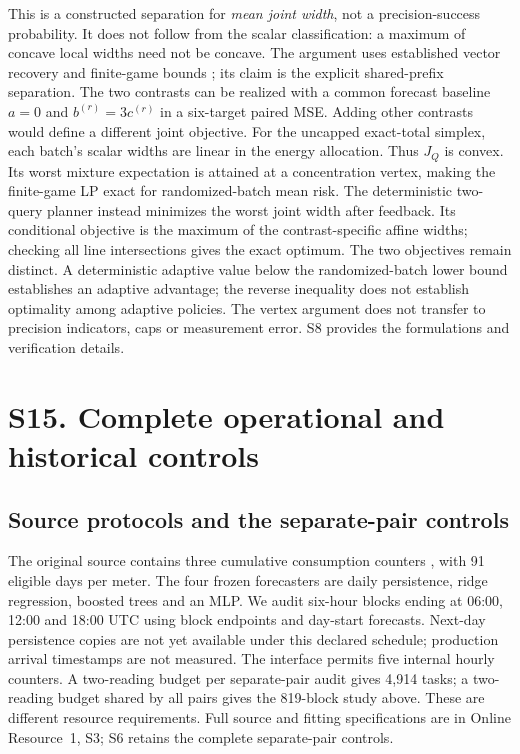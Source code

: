 This is a constructed separation for \emph{mean joint width}, not a
precision-success probability.  It does not follow from the scalar
classification: a maximum of concave local widths need not be concave.
The argument uses established vector recovery and finite-game bounds
\citep{krieg2025}; its claim is the explicit shared-prefix separation.
The two contrasts can be realized with a common forecast baseline
$a=0$ and $b^{(r)}=3c^{(r)}$ in a six-target paired MSE.  Adding other
contrasts would define a different joint objective.
For the uncapped exact-total simplex, each batch's scalar widths are
linear in the energy allocation. Thus $J_Q$ is convex. Its worst mixture
expectation is attained at a concentration vertex, making the finite-game
LP exact for randomized-batch mean risk. The deterministic two-query
planner instead minimizes the worst joint width after feedback. Its
conditional objective is the maximum of the contrast-specific affine
widths; checking all line intersections gives the exact optimum.
The two objectives remain distinct. A deterministic adaptive value below
the randomized-batch lower bound establishes an adaptive advantage; the
reverse inequality does not establish optimality among adaptive policies.
The vertex argument does not transfer to precision indicators, caps or
measurement error. S8 provides the formulations and verification details.
\section{S15. Complete operational and historical controls}
\subsection{Source protocols and the separate-pair controls}
\label{sec:counter-precision-results:s15}
The original source contains three cumulative consumption counters
\citep{blem}, with 91 eligible days per meter. The four frozen forecasters
are daily persistence, ridge regression, boosted trees and an MLP. We audit
six-hour blocks ending at 06:00, 12:00 and 18:00 UTC using block endpoints
and day-start forecasts. Next-day persistence copies are not yet available
under this declared schedule; production arrival timestamps are not measured.
The interface permits five internal hourly counters. A two-reading budget
per separate-pair audit gives 4,914 tasks; a two-reading budget shared by
all pairs gives the 819-block study above. These are different resource
requirements. Full source and fitting specifications are in Online
Resource~1, S3; S6 retains the complete separate-pair controls.

